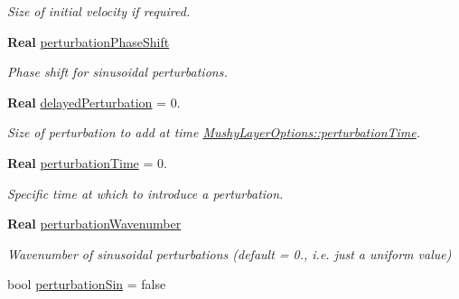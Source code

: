 \begin{DoxyCompactItemize}
\begin{DoxyCompactList}\small\item\em Size of initial velocity if required. \end{DoxyCompactList}\item 
\mbox{\label{struct_mushy_layer_options_a8d8e7f72875030205f5d9d0b8a937f59}} 
\textbf{ Real} \hyperlink{struct_mushy_layer_options_a8d8e7f72875030205f5d9d0b8a937f59}{perturbation\+Phase\+Shift}
\begin{DoxyCompactList}\small\item\em Phase shift for sinusoidal perturbations. \end{DoxyCompactList}\item 
\mbox{\label{struct_mushy_layer_options_a642211894ae1be9d12b1c2bf69128015}} 
\textbf{ Real} \hyperlink{struct_mushy_layer_options_a642211894ae1be9d12b1c2bf69128015}{delayed\+Perturbation} = 0.
\begin{DoxyCompactList}\small\item\em Size of perturbation to add at time \hyperlink{struct_mushy_layer_options_a19851a36aeca103fd11fe3aae89af265}{Mushy\+Layer\+Options\+::perturbation\+Time}. \end{DoxyCompactList}\item 
\mbox{\label{struct_mushy_layer_options_a19851a36aeca103fd11fe3aae89af265}} 
\textbf{ Real} \hyperlink{struct_mushy_layer_options_a19851a36aeca103fd11fe3aae89af265}{perturbation\+Time} = 0.
\begin{DoxyCompactList}\small\item\em Specific time at which to introduce a perturbation. \end{DoxyCompactList}\item 
\mbox{\label{struct_mushy_layer_options_a62029abc276b13b7a1be2d93a02d0c4c}} 
\textbf{ Real} \hyperlink{struct_mushy_layer_options_a62029abc276b13b7a1be2d93a02d0c4c}{perturbation\+Wavenumber}
\begin{DoxyCompactList}\small\item\em Wavenumber of sinusoidal perturbations (default = 0., i.\+e. just a uniform value) \end{DoxyCompactList}\item 
bool \hyperlink{struct_mushy_layer_options_ae7dba5b6442e8a93cbecac967a1b1d1c}{perturbation\+Sin} = false

\end{DoxyCompactItemize}
